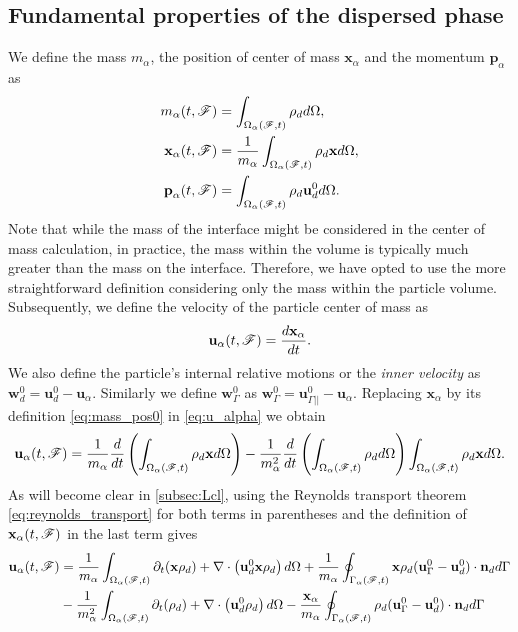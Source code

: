  \subsection{Fundamental properties of the dispersed phase}
We define the mass $m_\alpha$, the position of center of mass $\mathbf{x}_\alpha$ and the momentum $\textbf{p}_\alpha$ as
\begin{align}
    m_\alpha(t,\FF)
    &= \intOF{ \rho_d  }, 
    \\
    \textbf{x}_\alpha(t,\FF)
    &= \frac{1}{m_\alpha }\intOF{ \rho_d \textbf{x} }     \label{eq:mass_pos0},
    \\ \textbf{p}_\alpha(t,\FF)
    &= \intOF{ \rho_d \textbf{u}_d^0 }.
\end{align}
Note that while the mass of the interface might be considered in the center of mass calculation, in practice, the mass within the volume is typically much greater than the mass on the interface. 
Therefore, we have opted to use the more straightforward definition considering only the mass within the particle volume.
Subsequently, we define the velocity of the particle center of mass as
\begin{equation}
\textbf{u}_\alpha(t,\FF) = \frac{d \textbf{x}_\alpha}{dt}.
\label{eq:u_alpha}
\end{equation}
We also define the particle's internal relative motions or the \textit{inner velocity}  as $\textbf{w}_d^0 = \textbf{u}_d^0 - \textbf{u}_\alpha$. 
Similarly we define $\textbf{w}_\Gamma^0$ as $\textbf{w}_\Gamma^0 = \textbf{u}_{\Gamma||}^0 - \textbf{u}_\alpha$.
Replacing $\textbf{x}_\alpha$ by its definition \eqref{eq:mass_pos0} in \ref{eq:u_alpha} we obtain
\begin{equation}
    \textbf{u}_\alpha(t,\mathscr{F}) = \frac{1}{m_\alpha}
    \frac{d}{dt} 
    \left(
        \int_{\Omega_{\alpha}(\mathscr{F},t)}  \rho_d \textbf{x}  d\Omega
    \right)
    - \frac{1}{m_\alpha^2} \frac{d}{dt} \left(\int_{\Omega_{\alpha}(\mathscr{F},t)}  \rho_d  d\Omega \right)
    \int_{\Omega_{\alpha}(\mathscr{F},t)}  \rho_d \textbf{x}  d\Omega.
\end{equation}
As will become clear in \ref{subsec:Lcl}, using the Reynolds transport theorem \eqref{eq:reynolds_transport} for both terms in parentheses and the definition of $\textbf{x}_\alpha(t,\mathscr{F})$ in the last term gives
\begin{align}
    \textbf{u}_\alpha(t,\FF) &=  \frac{1}{m_\alpha}\intOF{
        \pddt (\textbf{x}\rho_d ) + \div\left(\textbf{u}_d^0 \textbf{x} \rho_d\right) 
    } 
    + \frac{1}{m_\alpha}\intSF{ \textbf{x} \rho_d(\textbf{u}_\Gamma^0 - \textbf{u}_d^0) \cdot \textbf{n}_d } \nonumber\\
    & - \frac{1}{m_\alpha^2}\intOF{
        \pddt (\rho_d ) + \div\left(\textbf{u}_d^0 \rho_d\right) 
    } -  \frac{\textbf{x}_\alpha}{m_\alpha}    \intSF{ \rho_d(\textbf{u}_\Gamma^0   - \textbf{u}_d^0) \cdot \textbf{n}_d }
    \label{eq:u_alpha2}
\end{align}
